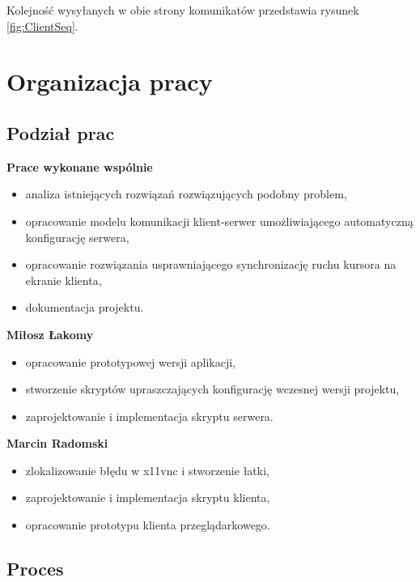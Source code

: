     Kolejność wysyłanych w obie strony komunikatów przedstawia rysunek \ref{fig:ClientSeq}.
    \vfill


\section{Organizacja pracy}

  \subsection{Podział prac}

    \textbf{Prace wykonane wspólnie}
    \begin{itemize}[noitemsep]
      \item analiza istniejących rozwiązań rozwiązujących podobny problem,
      \item opracowanie modelu komunikacji klient-serwer umożliwiającego automatyczną konfigurację serwera,
      \item opracowanie rozwiązania usprawniającego synchronizację ruchu kursora na ekranie klienta,
      \item dokumentacja projektu.
    \end{itemize}

    \noindent
    \textbf{Miłosz Łakomy}
    \begin{itemize}[noitemsep]
      \item opracowanie prototypowej wersji aplikacji,
      \item stworzenie skryptów upraszczających konfigurację wczesnej wersji projektu,
      \item zaprojektowanie i implementacja skryptu serwera.
    \end{itemize}

    \noindent
    \textbf{Marcin Radomski}
    \begin{itemize}[noitemsep]
      \item zlokalizowanie błędu w x11vnc i stworzenie łatki,
      \item zaprojektowanie i implementacja skryptu klienta,
      \item opracowanie prototypu klienta przeglądarkowego.
    \end{itemize}

  \subsection{Proces}

